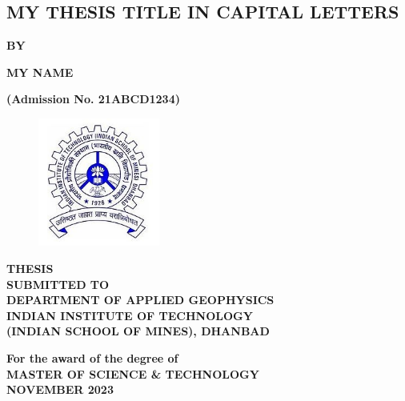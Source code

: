 \documentclass[12pt]{report}
\begin{document}
\begin{titlepage}
\begin{center}
   \section*{\fontsize{24}{24}\selectfont MY THESIS TITLE IN CAPITAL LETTERS}
   

\textbf{BY}

\textbf{\fontsize{14}{16}\selectfont MY NAME}

\textbf{\fontsize{14}{16}\selectfont (Admission No. 21ABCD1234)}


\begin{figure}[H]
    \centering
    \includegraphics[width=4cm]{ismlogo.jpg}
   
    \label{fig:enter-labe2l}
\end{figure}

\textbf{\fontsize{14}{16}\selectfont THESIS\\ SUBMITTED TO\\
DEPARTMENT OF APPLIED GEOPHYSICS\\
INDIAN INSTITUTE OF TECHNOLOGY\\
(INDIAN SCHOOL OF MINES), DHANBAD\\}


\vspace{1cm}

\textbf{\fontsize{14}{16}\selectfont For the award of the degree of\\
MASTER OF SCIENCE \& TECHNOLOGY\\   %
NOVEMBER 2023}

\end{center}

\end{titlepage}
\restoregeometry %
\end{document}

